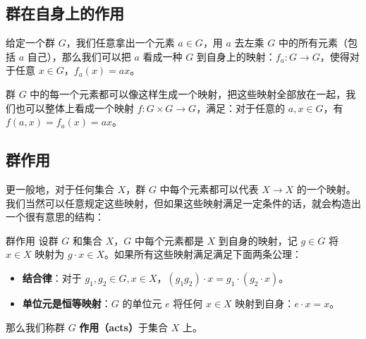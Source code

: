 


\subsection{群在自身上的作用}\label{sub_Group3_1}

给定一个群 $G$，我们任意拿出一个元素 $a\in G$，用 $a$ 去左乘 $G$ 中的所有元素（包括 $a$ 自己），那么我们可以把 $a$ 看成一种 $G$ 到自身上的映射：$f_a:G\rightarrow G$，使得对于任意 $x\in G$，$f_a(x)=ax$。

群 $G$ 中的每一个元素都可以像这样生成一个映射，把这些映射全部放在一起，我们也可以整体上看成一个映射 $f:G\times G\rightarrow G$，满足：对于任意的 $a, x\in G$，有 $f(a,x)=f_a(x)=ax$。


% 

\subsection{群作用}


更一般地，对于任何集合 $X$，群 $G$ 中每个元素都可以代表 $X\rightarrow X$ 的一个映射。我们当然可以任意规定这些映射，但如果这些映射满足一定条件的话，就会构造出一个很有意思的结构：

\begin{definition}{群作用}\label{def_Group3_1}
设群 $G$ 和集合 $X$，$G$ 中每个元素都是 $X$ 到自身的映射，记 $g\in G$ 将 $x\in X$ 映射为 $g\cdot x\in X$。如果所有这些映射满足满足下面两条公理：
\begin{itemize}
\item \textbf{结合律}：对于 $g_1, g_2\in G, x\in X$，$(g_1 g_2)\cdot x=g_1\cdot (g_2\cdot x)$。
\item \textbf{单位元是恒等映射}：$G$ 的单位元 $e$ 将任何 $x\in X$ 映射到自身：$e\cdot x=x$。
\end{itemize}

那么我们称群 $G$ \textbf{作用（acts）}于集合 $X$ 上。

\end{definition}

